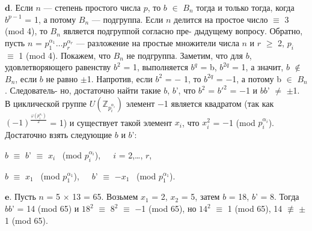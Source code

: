 $\mathbf{d.}$ Если $n$ --- степень простого числа $p$, то $b$ $\in$ $B_{n}$ тогда и только \linebreak
тогда, когда $b^{p-1}$ = 1, а потому $B_{n}$ --- подгруппа. Если $n$ делится на \linebreak
простое число $\equiv$ 3 (mod 4), то $B_{n}$ является подгруппой согласно пре­- \linebreak
дыдущему вопросу. Обратно, пусть $n$ = $p_{1}^{\alpha_{1}}\dots p_{r}^{\alpha_{r}}$ --- разложение на \linebreak
простые множители числа $n$ и $r$ $\geqslant$ 2, $p_{i}$ $\equiv$ 1 (mod 4). Покажем, что $B_{n}$ \linebreak
не подгруппа. Заметим, что для $b$, удовлетворяющего равенству $b^{2}$ = 1, \linebreak
выполняется $b^{q}$ = b, $b^{2q}$ = 1, а значит, $b$ $\notin$ $B_{n}$, если $b$ не равно $\pm$1. \linebreak
Напротив, если $b^{2}$ = $-$ 1, то $b^{2q}$ = $-$1, а потому b $\in$ $B_{n}$. Следователь­- \linebreak
но, достаточно найти такие $b$, $b$', что  $b^{2}$ =  $b'^{2}$ = $-$1 и $bb$' $\ne$ $\pm$1. В \linebreak
циклической группе $U(\mathbb Z_{p_{i}^{\alpha_{i}}})$ элемент $-$1 является квадратом (так как \linebreak
$(-1)^{\frac{\varphi (p^{\alpha_{i}}_{i})}{2}}$ = 1) и существует такой элемент $x_{i}$, что $x^{2}_{i}$ = $-$1 (mod $p^{\alpha_{i}}_{i}$). \linebreak
Достаточно взять следующие $b$ и $b$': \ 

\vspace{6pt} 
\hspace{42pt} $b$ $\equiv$ $b$' $\equiv$ $x_{i}$ \  (mod $p_{i}^{\alpha_{i}}$),\ \ \  $i$ = 2,\dots, $r$, \ 

\vspace{5pt}
\hspace{82pt} $b$ $\equiv$ $x_{1}$ \  (mod $p_{1}^{\alpha_{1}}$),\ \ \   $b$' $\equiv$ $-x_{1}$ \  (mod $p^{\alpha_{1}}_{1}$). \newline

$\mathbf{e.}$ Пусть $n$ = 5 $\times$ 13 = 65. Возьмем $x_{1}$ = 2, $x_{2}$ = 5, затем $b$ = 18, \linebreak
$b$' = 8. Тогда $bb$' = 14 (mod 65) и $18^{2}$ $\equiv$ $8^{2}$ $\equiv$ $-$1 (mod 65), но $14^{2}$ $\equiv$ 1 \linebreak
(mod 65), 14 $\not\equiv$ $\pm$1 (mod 65).

